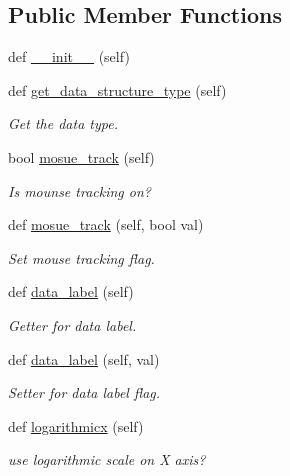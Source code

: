 \subsection*{Public Member Functions}
\begin{DoxyCompactItemize}
\item 
def \mbox{\hyperlink{classbridges_1_1line__chart_1_1_line_chart_a20c96d892b92624aa367710c9b4386fa}{\+\_\+\+\_\+init\+\_\+\+\_\+}} (self)
\item 
def \mbox{\hyperlink{classbridges_1_1line__chart_1_1_line_chart_a8124cb8693d6564a64264747d6ca5021}{get\+\_\+data\+\_\+structure\+\_\+type}} (self)
\begin{DoxyCompactList}\small\item\em Get the data type. \end{DoxyCompactList}\item 
bool \mbox{\hyperlink{classbridges_1_1line__chart_1_1_line_chart_a524828aa8951e4e9a515ea20692fc654}{mosue\+\_\+track}} (self)
\begin{DoxyCompactList}\small\item\em Is mounse tracking on? \end{DoxyCompactList}\item 
def \mbox{\hyperlink{classbridges_1_1line__chart_1_1_line_chart_aadf9c7d6cc6b281e64563356fbe84ef8}{mosue\+\_\+track}} (self, bool val)
\begin{DoxyCompactList}\small\item\em Set mouse tracking flag. \end{DoxyCompactList}\item 
def \mbox{\hyperlink{classbridges_1_1line__chart_1_1_line_chart_a0b93e3215dbaefa1e24bd2881393014c}{data\+\_\+label}} (self)
\begin{DoxyCompactList}\small\item\em Getter for data label. \end{DoxyCompactList}\item 
def \mbox{\hyperlink{classbridges_1_1line__chart_1_1_line_chart_a92796d1738604f9d6417fa7eebb4352e}{data\+\_\+label}} (self, val)
\begin{DoxyCompactList}\small\item\em Setter for data label flag. \end{DoxyCompactList}\item 
def \mbox{\hyperlink{classbridges_1_1line__chart_1_1_line_chart_a7f2d2f772e00af6ce08aa40e1efb195c}{logarithmicx}} (self)
\begin{DoxyCompactList}\small\item\em use logarithmic scale on X axis? \end{DoxyCompactList}\item 

\end{DoxyCompactItemize}
